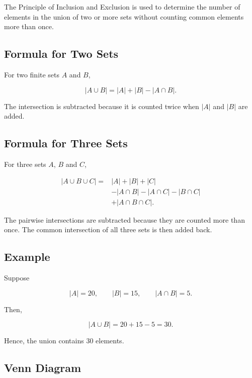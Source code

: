 \documentclass[12pt,a4paper]{article}
\begin{document}
The Principle of Inclusion and Exclusion is used to determine the number
of elements in the union of two or more sets without counting common
elements more than once.


\subsection{Formula for Two Sets}

For two finite sets $A$ and $B$,

\[
|A\cup B|
=
|A|+|B|-|A\cap B|.
\]

The intersection is subtracted because it is counted twice when $|A|$
and $|B|$ are added.


\subsection{Formula for Three Sets}

For three sets $A$, $B$ and $C$,

\[
\begin{aligned}
|A\cup B\cup C|
={}&|A|+|B|+|C|\\
&-|A\cap B|-|A\cap C|-|B\cap C|\\
&+|A\cap B\cap C|.
\end{aligned}
\]

The pairwise intersections are subtracted because they are counted more
than once. The common intersection of all three sets is then added back.


\subsection{Example}

Suppose

\[
|A|=20,\qquad
|B|=15,\qquad
|A\cap B|=5.
\]

Then,

\[
|A\cup B|
=
20+15-5
=
30.
\]

Hence, the union contains 30 elements.


\subsection{Venn Diagram}
\end{document}
